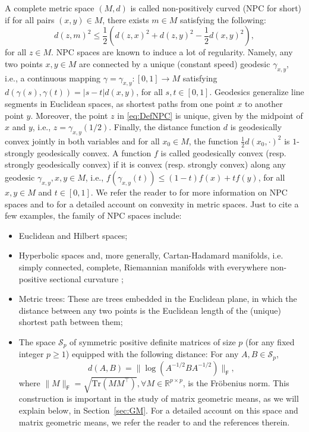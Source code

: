 \documentclass[10pt,a4paper]{article}
\theoremstyle{plain}
\theoremstyle{definition}
\theoremstyle{remark}
\newcommand{\R}{\mathbb{R}}
\begin{document}
A complete metric space $(M,d)$ is called non-positively curved (NPC for short) if for all pairs $(x,y)\in M$, there exists $m\in M$ satisfying the following: 
\begin{equation}\label{eq:DefNPC}
    d(z,m)^2\leq \frac{1}{2}(d(z,x)^2+d(z,y)^2-\frac{1}{2}d(x,y)^2),
\end{equation}
for all $z\in M$. NPC spaces are known to induce a lot of regularity. Namely, any two points $x,y\in M$ are connected by a unique (constant speed) geodesic $\gamma_{x,y}$, i.e., a continuous mapping $\gamma=\gamma_{x,y}:[0,1]\to M$ satisfying $d(\gamma(s),\gamma(t))=|s-t|d(x,y)$, for all $s,t\in[0,1]$. Geodesics generalize line segments in Euclidean spaces, as shortest paths from one point $x$ to another point $y$. Moreover, the point $z$ in \eqref{eq:DefNPC} is unique, given by the midpoint of $x$ and $y$, i.e., $z=\gamma_{x,y}(1/2)$. Finally, the distance function $d$ is geodesically convex jointly in both variables and for all $x_0\in M$, the function $\frac{1}{2}d(x_0,\cdot)^2$ is $1$-strongly geodesically convex. A function $f$ is called geodesically convex (resp. strongly geodesically convex) if it is convex (resp. strongly convex) along any geodesic $\gamma_{x,y}, x,y\in M$, i.e., $f(\gamma_{x,y}(t))\leq (1-t)f(x)+tf(y)$, for all $x,y\in M$ and $t\in [0,1]$. We refer the reader to \cite{sturm03,bridson2013metric} for more information on NPC spaces and to \cite{bacak2014convex} for a detailed account on convexity in metric spaces. Just to cite a few examples, the family of NPC spaces include: 
\begin{itemize}
    \item Euclidean and Hilbert spaces;
    \item Hyperbolic spaces and, more generally, Cartan-Hadamard manifolds, i.e. simply connected, complete, Riemannian manifolds with everywhere non-positive sectional curvature \cite[Proposition 3.1]{sturm03};
    \item Metric trees: These are trees embedded in the Euclidean plane, in which the distance between any two points is the Euclidean length of the (unique) shortest path between them;
    \item The space $\mathcal S_p$ of symmetric positive definite matrices of size $p$ (for any fixed integer $p\geq 1$) equipped with the following distance: For any $A,B\in\mathcal S_p$, 
$$d(A,B)=\|\log(A^{-1/2}BA^{-1/2})\|_{\textsf{F}},$$
where $\|M\|_{\textsf{F}}=\sqrt{\text{Tr}(MM^\top)}, \forall M\in\R^{p\times p}$, is the Fröbenius norm. This construction is important in the study of matrix geometric means, as we will explain below, in Section~\ref{sec:GM}. For a detailed account on this space and matrix geometric means, we refer the reader to \cite{bhatia2006riemannian} and the references therein.
\end{itemize}
\end{document}
